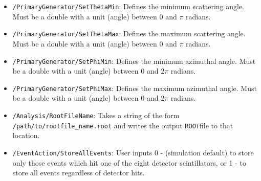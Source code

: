 \documentclass[11pt]{article}
\begin{document}
\begin{itemize}
 \item \texttt{/PrimaryGenerator/SetThetaMin}: Defines the minimum scattering angle. Must be a double with a unit (angle) between 0 and $\pi$ radians.
 \item \texttt{/PrimaryGenerator/SetThetaMax}: Defines the maximum scattering angle. Must be a double with a unit (angle) between 0 and $\pi$ radians.
 \item \texttt{/PrimaryGenerator/SetPhiMin}: Defines the minimum azimuthal angle. Must be a double with a unit (angle) between 0 and $2\pi$ radians.
 \item \texttt{/PrimaryGenerator/SetPhiMax}: Defines the maximum azimuthal angle. Must be a double with a unit (angle) between 0 and $2\pi$ radians.
 \item \texttt{/Analysis/RootFileName}: Takes a string of the form \texttt{/path/to/rootfile\_name.root} and writes the output \texttt{ROOT}file to that location.
 \item \texttt{/EventAction/StoreAllEvents}: User inputs 0 - (simulation default) to store only those events which hit one of the eight detector scintillators, or 1 - to store all events regardless of detector hits.
\end{itemize}
\pagebreak
\end{document}
